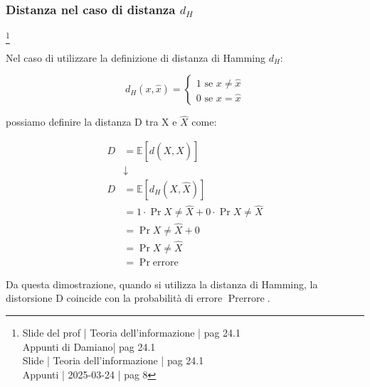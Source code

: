 \subsubsection{Distanza nel caso di distanza $d_H$}
\footnote{Slide del prof | Teoria dell'informazione | pag 24.1 \\  
Appunti di Damiano| pag 24.1 \\
Slide | Teoria dell'informazione | pag 24.1 \\
Appunti | 2025-03-24 | pag 8
}

Nel caso di utilizzare la definizione di distanza di Hamming $d_H$: 

{
    \Large 
    \begin{equation}
        d_H (x, \hat{x})
        = 
        \begin{cases}
            1 \text{ se } x \neq \hat{x}
            \\
            0 \text{ se } x = \hat{x}
        \end{cases}
    \end{equation}
}

possiamo definire la distanza D tra X e $\hat{X}$ come: 

{
    \Large 
    \begin{equation}
        \begin{split}
            D 
            &=
            \mathbb{E} \left[ d(X, \hat{X}) \right]
            \\
            &\downarrow
            \\
            D 
            &=
            \mathbb{E} \left[ d_H(X, \hat{X}) \right]
            \\
            &= 
            1 \cdot \Pr{X \neq \hat{X}}
            +
            0 \cdot \Pr{X \neq \hat{X}}
            \\
            &=
            \Pr{X \neq \hat{X}} + 0 
            \\
            &= 
            \Pr{X \neq \hat{X}}
            \\
            &= 
            \Pr{\text{errore}}
        \end{split}
    \end{equation}
}

Da questa dimostrazione, quando si utilizza la distanza di Hamming, la distorsione D coincide con la probabilità di errore $\Pr{\text{errore}}$. \newline 


\newpage 

